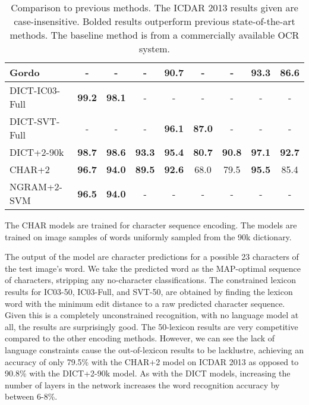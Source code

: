 \documentclass{article} \usepackage{nips14submit_e,times}
\renewcommand{\paragraph}[1]{\par\noindent{\bf #1}}
\begin{document}
\begin{table}[t]
\begin{center}
\begin{tabular}[t]{|l||c|c|c|c|c|c|c|c|}
Gordo~\cite{Gordo14} & - & - & - & 90.7 & - & - & 93.3 & 86.6\\
\hline
\rowcolor{Gray}
DICT-IC03-Full & \bf 99.2 & \bf 98.1 & - & - & - & - & - & -\\
DICT-SVT-Full  & - & - & - & \bf 96.1 & \bf 87.0 & - & - & -\\
\rowcolor{Gray}
DICT+2-90k     & \bf 98.7 & \bf 98.6 & \bf 93.3 & \bf 95.4 & \bf 80.7 & \bf 90.8 & \bf 97.1 & \bf 92.7\\
CHAR+2     & \bf 96.7 & \bf 94.0 & \bf 89.5 & \bf 92.6 & 68.0 & 79.5 & \bf 95.5 & 85.4\\
\rowcolor{Gray}
NGRAM+2-SVM & \bf 96.5 & \bf 94.0 & - & - & - & - & - & -\\


\hline
\end{tabular}
\end{center}
\vspace*{-1em}
\caption{\small Comparison to previous methods. The ICDAR 2013 results given are case-insensitive. Bolded results outperform previous state-of-the-art methods. The baseline method is from a commercially available OCR system. }
\label{table:comparison}
\end{table}

\paragraph{Character Sequence Encoding.}
The CHAR models are trained for character sequence encoding. The models are trained on image samples of words uniformly sampled from the 90k dictionary.

The output of the model are character predictions for a possible 23 characters of the test image's word. We take the predicted word as the MAP-optimal sequence of characters, stripping any no-character classifications. The constrained lexicon results for IC03-50, IC03-Full, and SVT-50, are obtained by finding the lexicon word with the minimum edit distance to a raw predicted character sequence. Given this is a completely unconstrained recognition, with no language model at all, the results are surprisingly good. The 50-lexicon results are very competitive compared to the other encoding methods. However, we can see the lack of language constraints cause the out-of-lexicon results to be lacklustre, achieving an accuracy of only 79.5\% with the CHAR+2 model on ICDAR 2013 as opposed to 90.8\% with the DICT+2-90k model. As with the DICT models, increasing the number of layers in the network increases the word recognition accuracy by between 6-8\%.
\end{document}
